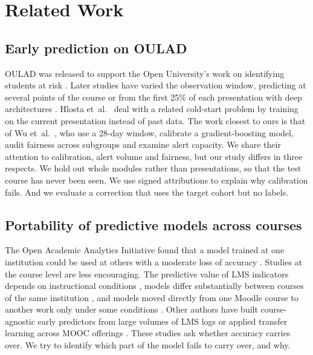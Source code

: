 \documentclass[journal]{IEEEtran}
\begin{document}
\section{Related Work}
\label{sec:related}

\subsection{Early prediction on OULAD}
OULAD was released to support the Open University's work on identifying students at risk \cite{kuzilek2017oulad}. Later studies have varied the observation window, predicting at several points of the course \cite{adnan2021percentages} or from the first 25\% of each presentation with deep architectures \cite{malkani2026kronecker}. Hlosta et~al.\ \cite{hlosta2017ouroboros} deal with a related cold-start problem by training on the current presentation instead of past data. The work closest to ours is that of Wu et~al.\ \cite{wu2026calibrated}, who use a 28-day window, calibrate a gradient-boosting model, audit fairness across subgroups and examine alert capacity. We share their attention to calibration, alert volume and fairness, but our study differs in three respects. We hold out whole modules rather than presentations, so that the test course has never been seen. We use signed attributions to explain why calibration fails. And we evaluate a correction that uses the target cohort but no labels.

\subsection{Portability of predictive models across courses}
The Open Academic Analytics Initiative found that a model trained at one institution could be used at others with a moderate loss of accuracy \cite{jayaprakash2014oaai}. Studies at the course level are less encouraging. The predictive value of LMS indicators depends on instructional conditions \cite{gasevic2016onesize}, models differ substantially between courses of the same institution \cite{conijn2017lms}, and models moved directly from one Moodle course to another work only under some conditions \cite{lopezzambrano2020portability}. Other authors have built course-agnostic early predictors from large volumes of LMS logs \cite{riestra2021massive} or applied transfer learning across MOOC offerings \cite{boyer2015transfer}. These studies ask whether accuracy carries over. We try to identify which part of the model fails to carry over, and why.
\end{document}
